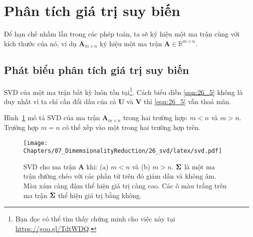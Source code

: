 

\section{Phân tích giá trị suy biến}
Để hạn chế nhầm lẫn trong các phép toán, ta sẽ ký hiệu một ma trận cùng với kích thước của nó, ví dụ $\mathbf{A}_{m \times n}$ ký hiệu một ma trận
$\mathbf{A} \in \mathbb{R}^{m \times n}$.

\subsection{Phát biểu phân tích giá trị suy biến}
{}


SVD của một ma trận bất kỳ luôn tồn tại\footnote{Bạn đọc có thể tìm thấy chứng
minh cho việc này tại \url{https://goo.gl/TdtWDQ}.}. Cách biểu diễn
\eqref{eqn:26_5} không là duy nhất vì ta chỉ cần đổi dấu của cả $\mathbf{U}$ và
$\mathbf{V}$ thì \eqref{eqn:26_5} vẫn thoả mãn.

Hình~\ref{fig:26_1} mô tả SVD của ma trận $\mathbf{A}_{m \times n}$ trong hai
trường hợp: $m < n$ và $m > n$. Trường hợp $m =n$ có thể xếp vào một trong hai
trường hợp trên.

\begin{figure}[t]
\centering
\texttt{[image: Chapters/07\_DimemsionalityReduction/26\_svd/latex/svd.pdf]}
\caption[]{SVD cho ma trận $\mathbf{A}$ khi: (a) $m < n$ và (b) $m > n$. $\mathbf{\Sigma}$ là một ma trận đường chéo với các phần tử trên đó
giảm dần và không âm. Màu xám càng đậm thể hiện giá trị càng cao. Các ô màu
trắng trên ma trận $\mathbf{\Sigma}$ thể hiện giá trị bằng không.}
\label{fig:26_1}
\end{figure}

